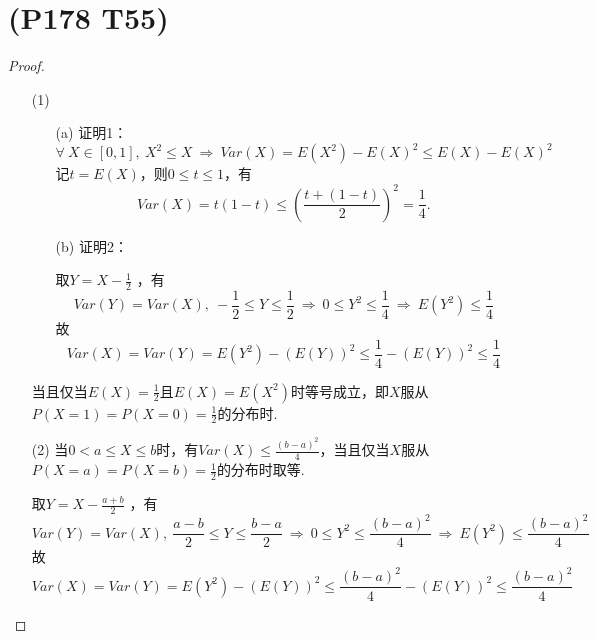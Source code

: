 \documentclass{article}
\begin{document}
\section{(P178 T55)}  %
\begin{proof}
    \begin{enumerate}
        \item []
        \item [(1)]
        \begin{enumerate}
            \item [(a)]证明1：
            \[
                \forall\ X\in [0,1],\ 
                X^2\leq X
                \ \Rightarrow\ 
                Var(X)
                = E(X^2) - {E(X)}^2
                \leq E(X) - {E(X)}^2   
            \]
            记$t = E(X)$，则$0\leq t \leq 1$，有
            \[
                Var(X) = t(1-t) \leq {\left(\frac{t+(1-t)}{2}\right)}^2 = \frac{1}{4}.    
            \]
            \item [(b)]证明2：
            
            取$Y = X - \displaystyle{\frac{1}{2}}$ ，有
            \[
                Var(Y) = Var(X),\ 
                -\frac{1}{2} \leq Y \leq \frac{1}{2}
                \ \Rightarrow\ 
                0\leq Y^2 \leq \frac{1}{4}
                \ \Rightarrow\ 
                E(Y^2) \leq \frac{1}{4}
            \]
            故
            \[
                Var(X) 
                = Var(Y) = E(Y^2) - {\left(E(Y)\right)}^2 
                \leq \frac{1}{4} - {\left(E(Y)\right)}^2 
                \leq \frac{1}{4}
            \]
        \end{enumerate}
        
        当且仅当$E(X)=\frac{1}{2}$且$E(X) = E(X^2)$时等号成立，即$X$服从$P(X=1)=P(X=0)=\displaystyle{\frac{1}{2}}$的分布时.
        \item [(2)]当$0<a\leq X\leq b$时，有$Var(X)\leq \displaystyle{\frac{{(b-a)}^2}{4}}$，当且仅当$X$服从$P(X=a)=P(X=b)=\displaystyle{\frac{1}{2}}$的分布时取等.
        
        取$Y = X - \displaystyle{\frac{a+b}{2}}$ ，有
        \[
            Var(Y) = Var(X), \ 
            \frac{a-b}{2} \leq Y \leq \frac{b-a}{2}
            \ \Rightarrow\ 
            0 \leq Y^2 \leq \frac{{(b-a)}^2}{4}
            \ \Rightarrow\ 
            E(Y^2)\leq \frac{{(b-a)}^2}{4}
        \]
        故
        \[
            Var(X) 
            = Var(Y) = E(Y^2) - {\left(E(Y)\right)}^2 
            \leq \frac{{(b-a)}^2}{4} - {\left(E(Y)\right)}^2 
            \leq \frac{{(b-a)}^2}{4}
        \]
    \end{enumerate}
\end{proof}
\end{document}
